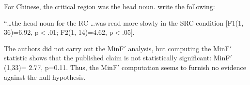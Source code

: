 \documentclass{ar-1col}\usepackage[]{graphicx}\usepackage[]{color}
\begin{document}
For Chinese, the critical region was the head noun. \citet{gibsonwu} write the following:

\begin{extract}
``\dots the head noun for the RC \dots was read more slowly in the SRC condition [F1(1, 36)=6.92, p$<$.01; F2(1, 14)=4.62, p$<$.05].
\end{extract}


The authors did not carry out the MinF$'$ analysis, but computing the MinF$'$ statistic shows that the published claim is not statistically significant: MinF$'$(1,33)= 2.77, p=0.11. Thus, the MinF$'$ computation seems to furnish no evidence against the null hypothesis.







\end{document}
